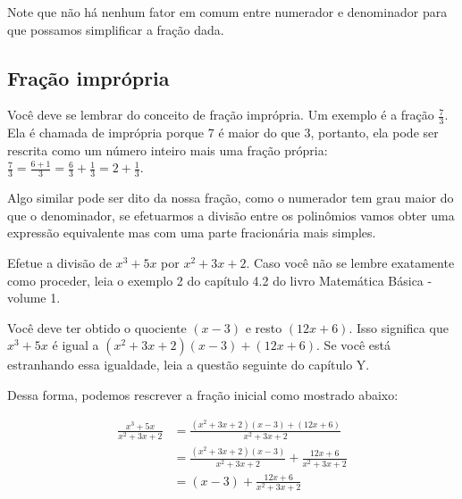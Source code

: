 \documentclass[main_estudante.tex]{subfiles}
\begin{document}
Note que não há nenhum fator em comum entre numerador e denominador para que possamos simplificar a fração dada.

\subsection*{Fração imprópria}

Você deve se lembrar do conceito de fração imprópria. Um exemplo é a fração $\frac{7}{3}$. Ela é chamada de imprópria porque 7 é maior do que 3, portanto, ela pode ser rescrita como um número inteiro mais uma fração própria:$\frac{7}{3}=\frac{6+1}{3}=\frac{6}{3}+\frac{1}{3}=2+\frac{1}{3}$.

Algo similar pode ser dito da nossa fração, como o numerador tem grau maior do que o denominador, se efetuarmos a divisão entre os polinômios vamos obter uma expressão equivalente mas com uma parte fracionária mais simples.


\begin{questao}
Efetue a divisão de ${x^3+5x}$ por ${x^2+3x+2}$. Caso você não se lembre exatamente como proceder, leia o exemplo 2 do capítulo 4.2 do livro Matemática Básica - volume 1.
\end{questao}


Você deve ter obtido o quociente $(x-3)$ e resto $(12x+6)$. Isso significa que ${x^3+5x}$ é igual a $(x^2+3x+2)(x-3)+(12x+6)$. Se você está estranhando essa igualdade, leia a questão seguinte do capítulo Y. 

Dessa forma, podemos rescrever a fração inicial como mostrado abaixo:

\begin{align*}
\frac{x^3+5x}{x^2+3x+2} &= \frac{(x^2+3x+2)(x-3)+(12x+6)}{x^2+3x+2} \\
&=\frac{(x^2+3x+2)(x-3)}{x^2+3x+2}+\frac{12x+6}{x^2+3x+2} \\
&=(x-3)+\frac{12x+6}{x^2+3x+2} \\
\end{align*}
\end{document}
